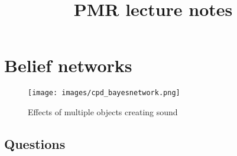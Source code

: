 \documentclass[11pt]{report}
\begin{document}
\title{PMR lecture notes}
\maketitle
\tableofcontents

\chapter{Belief networks}
\begin{figure}[H]
\centering
\texttt{[image: images/cpd\_bayesnetwork.png]}
\caption{Effects of multiple objects creating sound}
\label{sensorymockup2}
\end{figure}


\section{Questions}
\end{document}
